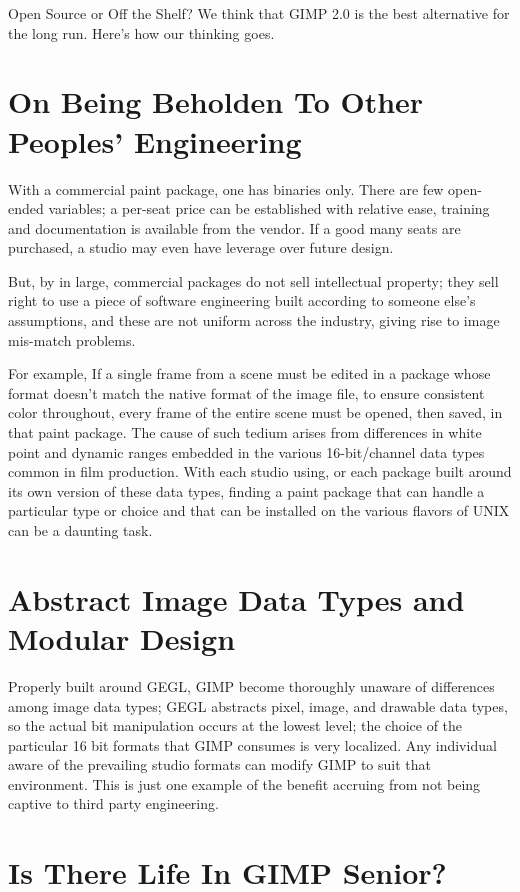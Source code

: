 Open Source or Off the Shelf? We think that GIMP
2.0 is the best alternative for the long
run. Here's how our thinking goes.

\section{On Being Beholden To Other Peoples' Engineering}

With a commercial paint package, one has binaries
only.  There are few open-ended variables; a
per-seat price can be established with relative
ease, training and documentation is available from
the vendor. If a good many seats are purchased, a
studio may even have leverage over future design.

But, by in large, commercial packages do not sell
intellectual property; they sell right to use a
piece of software engineering built according to
someone else's assumptions, and these are not
uniform across the industry, giving rise to image
mis-match problems.

For example, If a single frame from a scene must
be edited in a package whose format doesn't match
the native format of the image file, to ensure
consistent color throughout, every frame of the
entire scene must be opened, then saved, in that
paint package. The cause of such tedium arises
from differences in white point and dynamic ranges
embedded in the various 16-bit/channel data types
common in film production. With each studio using,
or each package built around its own version of
these data types, finding a paint package that can
handle a particular type or choice and that can be
installed on the various flavors of UNIX can be a
daunting task.

\section{Abstract Image Data Types and Modular Design}

Properly built around GEGL, GIMP become thoroughly
unaware of differences among image data types;
GEGL abstracts pixel, image, and drawable data
types, so the actual bit manipulation occurs at
the lowest level; the choice of the particular 16
bit formats that GIMP consumes is very localized.
Any individual aware of the prevailing studio
formats can modify GIMP to suit that environment.
This is just one example of the benefit accruing from
not being captive to third party engineering.

\section{Is There Life In GIMP Senior?}

